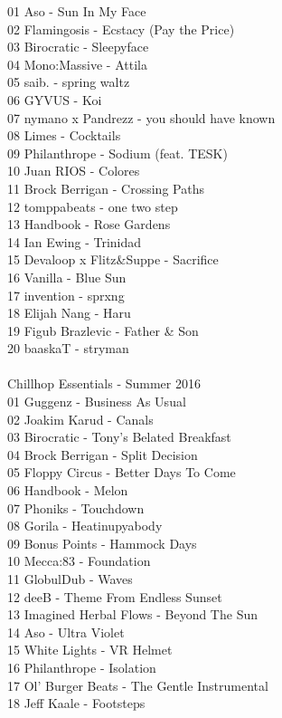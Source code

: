 \begin{multicols}{2}
 01 Aso - Sun In My Face\\ 02 Flamingosis - Ecstacy (Pay the Price)\\ 03 Birocratic - Sleepyface\\ 04 Mono:Massive - Attila\\ 05 saib. - spring waltz\\ 06 GYVUS - Koi\\ 07 nymano x Pandrezz - you should have known\\ 08 Limes - Cocktails\\ 09 Philanthrope - Sodium (feat. TESK)\\ 10 Juan RIOS - Colores\\ 11 Brock Berrigan - Crossing Paths\\ 12 tomppabeats - one two step\\ 13 Handbook - Rose Gardens\\ 14 Ian Ewing - Trinidad\\ 15 Devaloop x Flitz\&Suppe - Sacrifice\\ 16 Vanilla - Blue Sun\\ 17 invention - sprxng\\ 18 Elijah Nang - Haru\\ 19 Figub Brazlevic - Father \& Son\\ 20 baaskaT - stryman\\
\\ \large Chillhop Essentials - Summer 2016 \normalsize\\
 01 Guggenz - Business As Usual\\ 02 Joakim Karud - Canals\\ 03 Birocratic - Tony's Belated Breakfast\\ 04 Brock Berrigan - Split Decision\\ 05 Floppy Circus - Better Days To Come\\ 06 Handbook - Melon\\ 07 Phoniks - Touchdown\\ 08 Gorila - Heatinupyabody\\ 09 Bonus Points - Hammock Days\\ 10 Mecca:83 - Foundation\\ 11 GlobulDub - Waves\\ 12 deeB - Theme From Endless Sunset\\ 13 Imagined Herbal Flows - Beyond The Sun\\ 14 Aso - Ultra Violet\\ 15 White Lights - VR Helmet\\ 16 Philanthrope - Isolation\\ 17 Ol' Burger Beats - The Gentle Instrumental\\ 18 Jeff Kaale - Footsteps\\

\end{multicols}
